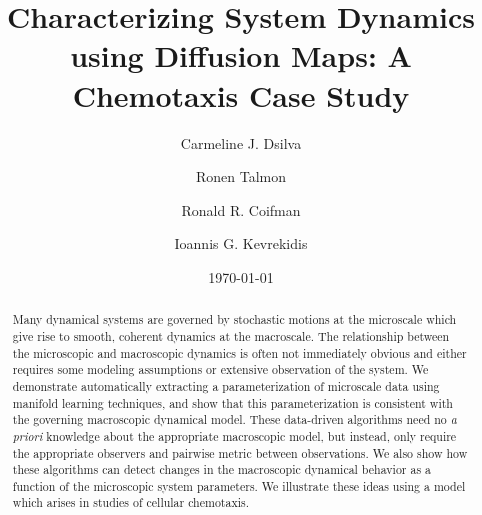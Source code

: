 \documentclass[prl, reprint]{revtex4-1}
\begin{document}
\title{Characterizing System Dynamics using Diffusion Maps: A Chemotaxis Case Study}

\author{Carmeline J. Dsilva}

\author{Ronen Talmon}

\author{Ronald R. Coifman}

\author{Ioannis G. Kevrekidis}

\date{\today}

\begin{abstract}

Many dynamical systems are governed by stochastic motions at the microscale which give rise to smooth, coherent dynamics at the macroscale.
%
The relationship between the microscopic and macroscopic dynamics is often not immediately obvious and either requires some modeling assumptions or extensive observation of the system.
%
We demonstrate automatically extracting a parameterization of microscale data using manifold learning techniques, and show that this parameterization is consistent with the governing macroscopic dynamical model. 
%
These data-driven algorithms need no {\em a priori} knowledge about the appropriate macroscopic model, but instead, only require the appropriate observers and pairwise metric between observations.
%
We also show how these algorithms can detect changes in the macroscopic dynamical behavior as a function of the microscopic system parameters. 
%
We illustrate these ideas using a model which arises in studies of cellular chemotaxis.

\end{abstract}


\maketitle

 
\end{document}
